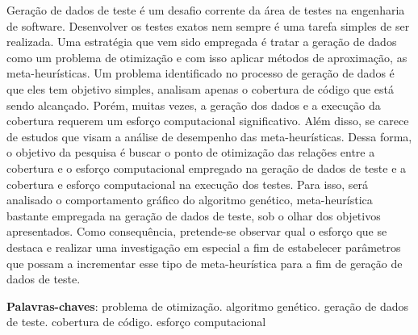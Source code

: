 \begin{resumo}
 
Geração de dados de teste é um desafio corrente da área de testes na engenharia de software. Desenvolver os testes exatos nem sempre é uma tarefa simples de ser realizada. Uma estratégia que vem sido empregada é tratar a geração de dados como um problema de otimização e com isso aplicar métodos de aproximação, as meta-heurísticas. Um problema identificado no processo de geração de dados é que eles tem objetivo simples, analisam apenas o cobertura de código que está sendo alcançado. Porém, muitas vezes, a geração dos dados e a execução da cobertura requerem um esforço computacional significativo. Além disso, se carece de estudos que visam a análise de desempenho das meta-heurísticas. Dessa forma, o objetivo da pesquisa é buscar o ponto de otimização das relações entre a cobertura e o esforço computacional empregado na geração de dados de teste e a cobertura e esforço computacional na execução dos testes. Para isso, será analisado o comportamento gráfico do algoritmo genético, meta-heurística bastante empregada na geração de dados de teste, sob o olhar dos objetivos apresentados. Como consequência, pretende-se observar qual o esforço que se destaca e realizar uma investigação em especial a fim de estabelecer parâmetros que possam a incrementar esse tipo de meta-heurística para a fim de geração de dados de teste.

 \vspace{\onelineskip}
    
 \noindent
 \textbf{Palavras-chaves}: problema de otimização. algoritmo genético. geração de dados de teste. cobertura de código. esforço computacional
\end{resumo}
